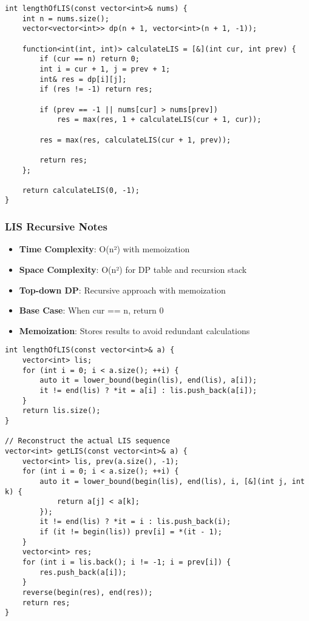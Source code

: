 \documentclass[11pt,a4paper]{article}
\begin{document}
\newpage
\begin{lstlisting}[caption={LIS - Recursive Implementation}]
int lengthOfLIS(const vector<int>& nums) {
    int n = nums.size();
    vector<vector<int>> dp(n + 1, vector<int>(n + 1, -1));

    function<int(int, int)> calculateLIS = [&](int cur, int prev) {
        if (cur == n) return 0;
        int i = cur + 1, j = prev + 1;
        int& res = dp[i][j];
        if (res != -1) return res;

        if (prev == -1 || nums[cur] > nums[prev]) 
            res = max(res, 1 + calculateLIS(cur + 1, cur));

        res = max(res, calculateLIS(cur + 1, prev));

        return res;
    };

    return calculateLIS(0, -1);
}
\end{lstlisting}

\subsubsection{LIS Recursive Notes}
\begin{itemize}
\item \textbf{Time Complexity}: O(n²) with memoization
\item \textbf{Space Complexity}: O(n²) for DP table and recursion stack
\item \textbf{Top-down DP}: Recursive approach with memoization
\item \textbf{Base Case}: When cur == n, return 0
\item \textbf{Memoization}: Stores results to avoid redundant calculations
\end{itemize}

\newpage
\begin{lstlisting}[caption={LIS - Binary Search Implementation}]
int lengthOfLIS(const vector<int>& a) {
    vector<int> lis;
    for (int i = 0; i < a.size(); ++i) {
        auto it = lower_bound(begin(lis), end(lis), a[i]);
        it != end(lis) ? *it = a[i] : lis.push_back(a[i]);
    }
    return lis.size();
}

// Reconstruct the actual LIS sequence
vector<int> getLIS(const vector<int>& a) {
    vector<int> lis, prev(a.size(), -1);
    for (int i = 0; i < a.size(); ++i) {
        auto it = lower_bound(begin(lis), end(lis), i, [&](int j, int k) { 
            return a[j] < a[k]; 
        });
        it != end(lis) ? *it = i : lis.push_back(i);
        if (it != begin(lis)) prev[i] = *(it - 1);
    }
    vector<int> res;
    for (int i = lis.back(); i != -1; i = prev[i]) {
        res.push_back(a[i]);
    }
    reverse(begin(res), end(res));
    return res;
}
\end{lstlisting}
\end{document}
